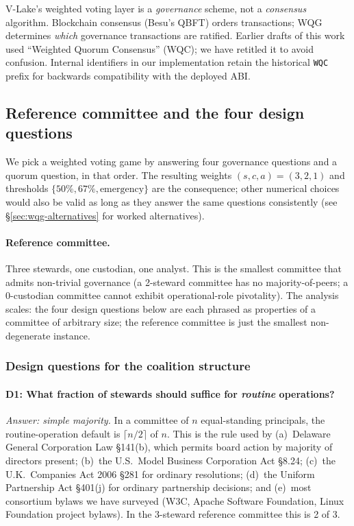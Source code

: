 \documentclass[10pt,twocolumn]{article}
\begin{document}
V-Lake's weighted voting layer is a \emph{governance} scheme, not a
\emph{consensus} algorithm. Blockchain consensus (Besu's QBFT)
orders transactions; WQG determines \emph{which} governance
transactions are ratified. Earlier drafts of this work used
``Weighted Quorum Consensus'' (WQC); we have retitled it to avoid
confusion. Internal identifiers in our implementation retain the
historical \texttt{WQC} prefix for backwards compatibility with
the deployed ABI.

\subsection{Reference committee and the four design questions}
\label{sec:wqg-weights}

We pick a weighted voting game by answering four governance
questions and a quorum question, in that order. The resulting
weights $(s,c,a)=(3,2,1)$ and thresholds $\{50\%, 67\%,
\text{emergency}\}$ are the consequence; other numerical choices
would also be valid as long as they answer the same questions
consistently (see \S\ref{sec:wqg-alternatives} for worked
alternatives).

\paragraph{Reference committee.}
Three stewards, one custodian, one analyst. This is the smallest
committee that admits non-trivial governance (a 2-steward committee
has no majority-of-peers; a 0-custodian committee cannot exhibit
operational-role pivotality). The analysis scales: the four design
questions below are each phrased as properties of a committee of
arbitrary size; the reference committee is just the smallest
non-degenerate instance.

\subsubsection{Design questions for the coalition structure}

\paragraph{D1: What fraction of stewards should suffice for
\emph{routine} operations?}
\emph{Answer: simple majority.} In a committee of $n$ equal-standing
principals, the routine-operation default is $\lceil n/2 \rceil$ of
$n$. This is the rule used by (a)~Delaware General Corporation Law
\S141(b), which permits board action by majority of directors
present; (b)~the U.S.\ Model Business Corporation Act \S8.24;
(c)~the U.K.\ Companies Act 2006 \S281 for ordinary resolutions;
(d)~the Uniform Partnership Act \S401(j) for ordinary partnership
decisions; and (e)~most consortium bylaws we have surveyed (W3C,
Apache Software Foundation, Linux Foundation project bylaws).
In the 3-steward reference committee this is 2 of 3.
\end{document}
